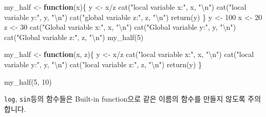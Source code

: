 \documentclass[
]{book}
\newenvironment{Shaded}{\begin{snugshade}}{\end{snugshade}}
\newcommand{\ControlFlowTok}[1]{\textcolor[rgb]{0.13,0.29,0.53}{\textbf{#1}}}
\newcommand{\DecValTok}[1]{\textcolor[rgb]{0.00,0.00,0.81}{#1}}
\newcommand{\FunctionTok}[1]{\textcolor[rgb]{0.00,0.00,0.00}{#1}}
\newcommand{\NormalTok}[1]{#1}
\newcommand{\OtherTok}[1]{\textcolor[rgb]{0.56,0.35,0.01}{#1}}
\newcommand{\SpecialCharTok}[1]{\textcolor[rgb]{0.00,0.00,0.00}{#1}}
\newcommand{\StringTok}[1]{\textcolor[rgb]{0.31,0.60,0.02}{#1}}
\begin{document}
\begin{Shaded}
\begin{Highlighting}[]
\NormalTok{my\_half }\OtherTok{\textless{}{-}} \ControlFlowTok{function}\NormalTok{(x)\{}
\NormalTok{  y }\OtherTok{\textless{}{-}}\NormalTok{ x}\SpecialCharTok{/}\NormalTok{z}
  \FunctionTok{cat}\NormalTok{(}\StringTok{"local variable x:"}\NormalTok{, x, }\StringTok{"}\SpecialCharTok{\textbackslash{}n}\StringTok{"}\NormalTok{)}
  \FunctionTok{cat}\NormalTok{(}\StringTok{"local variable y:"}\NormalTok{, y, }\StringTok{"}\SpecialCharTok{\textbackslash{}n}\StringTok{"}\NormalTok{)}
  \FunctionTok{cat}\NormalTok{(}\StringTok{"global variable z:"}\NormalTok{, z, }\StringTok{"}\SpecialCharTok{\textbackslash{}n}\StringTok{"}\NormalTok{)}
  \FunctionTok{return}\NormalTok{(y)}
\NormalTok{\}}
\NormalTok{y }\OtherTok{\textless{}{-}} \DecValTok{100}
\NormalTok{x }\OtherTok{\textless{}{-}} \DecValTok{20}
\NormalTok{z }\OtherTok{\textless{}{-}} \DecValTok{30}
\FunctionTok{cat}\NormalTok{(}\StringTok{"Global variable x:"}\NormalTok{, x, }\StringTok{"}\SpecialCharTok{\textbackslash{}n}\StringTok{"}\NormalTok{)}
\FunctionTok{cat}\NormalTok{(}\StringTok{"Global variable y:"}\NormalTok{, y, }\StringTok{"}\SpecialCharTok{\textbackslash{}n}\StringTok{"}\NormalTok{)}
\FunctionTok{cat}\NormalTok{(}\StringTok{"Global variable z:"}\NormalTok{, z, }\StringTok{"}\SpecialCharTok{\textbackslash{}n}\StringTok{"}\NormalTok{)}
\FunctionTok{my\_half}\NormalTok{(}\DecValTok{5}\NormalTok{)}

\NormalTok{my\_half }\OtherTok{\textless{}{-}} \ControlFlowTok{function}\NormalTok{(x, z)\{}
\NormalTok{  y }\OtherTok{\textless{}{-}}\NormalTok{ x}\SpecialCharTok{/}\NormalTok{z}
  \FunctionTok{cat}\NormalTok{(}\StringTok{"local variable x:"}\NormalTok{, x, }\StringTok{"}\SpecialCharTok{\textbackslash{}n}\StringTok{"}\NormalTok{)}
  \FunctionTok{cat}\NormalTok{(}\StringTok{"local variable y:"}\NormalTok{, y, }\StringTok{"}\SpecialCharTok{\textbackslash{}n}\StringTok{"}\NormalTok{)}
  \FunctionTok{cat}\NormalTok{(}\StringTok{"local variable z:"}\NormalTok{, z, }\StringTok{"}\SpecialCharTok{\textbackslash{}n}\StringTok{"}\NormalTok{)}
  \FunctionTok{return}\NormalTok{(y)}
\NormalTok{\}}

\FunctionTok{my\_half}\NormalTok{(}\DecValTok{5}\NormalTok{, }\DecValTok{10}\NormalTok{)}
\end{Highlighting}
\end{Shaded}

\texttt{log}, \texttt{sin}등의 함수들은 Built-in function으로 같은 이름의 함수를 만들지 않도록 주의합니다.
\end{document}
